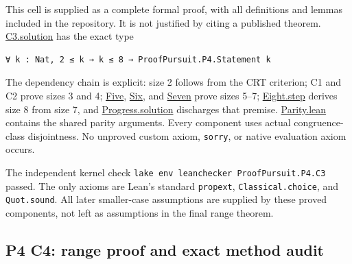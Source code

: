 \documentclass[11pt,a4paper]{article}
\begin{document}
This cell is supplied as a complete formal proof, with all definitions and lemmas included in the repository. It is not justified by citing a published theorem. \href{https://github.com/mpelteshki/climbing-to-the-frontier/blob/ed55f76eb8c558825bb629fd2cd8dbf46e5f1314/cagent/p4/lean/ProofPursuit/P4/C3.lean}{C3.solution} has the exact type

\begin{Verbatim}[breaklines,breakanywhere,fontsize=\footnotesize]
∀ k : Nat, 2 ≤ k → k ≤ 8 → ProofPursuit.P4.Statement k
\end{Verbatim}

The dependency chain is explicit: size 2 follows from the CRT criterion; C1 and C2 prove sizes 3 and 4; \href{https://github.com/mpelteshki/climbing-to-the-frontier/blob/ed55f76eb8c558825bb629fd2cd8dbf46e5f1314/cagent/p4/lean/ProofPursuit/P4/Five.lean}{Five}, \href{https://github.com/mpelteshki/climbing-to-the-frontier/blob/ed55f76eb8c558825bb629fd2cd8dbf46e5f1314/cagent/p4/lean/ProofPursuit/P4/Six.lean}{Six}, and \href{https://github.com/mpelteshki/climbing-to-the-frontier/blob/ed55f76eb8c558825bb629fd2cd8dbf46e5f1314/cagent/p4/lean/ProofPursuit/P4/Seven.lean}{Seven} prove sizes 5--7; \href{https://github.com/mpelteshki/climbing-to-the-frontier/blob/ed55f76eb8c558825bb629fd2cd8dbf46e5f1314/cagent/p4/lean/ProofPursuit/P4/Eight.lean}{Eight.step} derives size 8 from size 7, and \href{https://github.com/mpelteshki/climbing-to-the-frontier/blob/ed55f76eb8c558825bb629fd2cd8dbf46e5f1314/cagent/p4/lean/ProofPursuit/P4/Progress.lean}{Progress.solution} discharges that premise. \href{https://github.com/mpelteshki/climbing-to-the-frontier/blob/ed55f76eb8c558825bb629fd2cd8dbf46e5f1314/cagent/p4/lean/ProofPursuit/P4/Parity.lean}{Parity.lean} contains the shared parity arguments. Every component uses actual congruence-class disjointness. No unproved custom axiom, \texttt{sorry}, or native evaluation axiom occurs.

The independent kernel check \texttt{lake\ env\ leanchecker\ ProofPursuit.P4.C3} passed. The only axioms are Lean's standard \texttt{propext}, \texttt{Classical.choice}, and \texttt{Quot.sound}. All later smaller-case assumptions are supplied by these proved components, not left as assumptions in the final range theorem.

\subsection{P4 C4: range proof and exact method audit}\label{p4-c4-range-proof-and-exact-method-audit}
\end{document}
